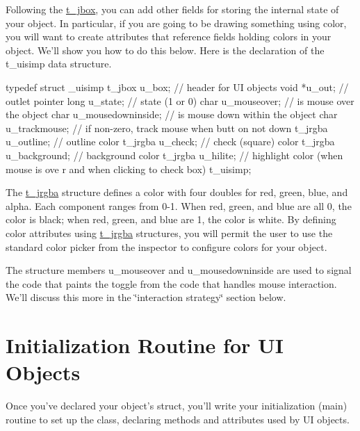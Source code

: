 Following the \hyperlink{structt__jbox}{t\_\-jbox}, you can add other fields for storing the internal state of your object. In particular, if you are going to be drawing something using color, you will want to create attributes that reference fields holding colors in your object. We'll show you how to do this below. Here is the declaration of the t\_\-uisimp data structure.


\begin{DoxyCode}
    typedef struct _uisimp 
    {
        t_jbox u_box;                       // header for UI objects
        void *u_out;                        // outlet pointer
        long u_state;                       // state (1 or 0)
        char u_mouseover;                   // is mouse over the object
        char u_mousedowninside;             // is mouse down within the object
        char u_trackmouse;                  // if non-zero, track mouse when butt
      on not down
        t_jrgba u_outline;                  // outline color
        t_jrgba u_check;                    // check (square) color
        t_jrgba u_background;               // background color
        t_jrgba u_hilite;                   // highlight color (when mouse is ove
      r and when clicking to check box)
    } t_uisimp;
\end{DoxyCode}


The \hyperlink{structt__jrgba}{t\_\-jrgba} structure defines a color with four doubles for red, green, blue, and alpha. Each component ranges from 0-\/1. When red, green, and blue are all 0, the color is black; when red, green, and blue are 1, the color is white. By defining color attributes using \hyperlink{structt__jrgba}{t\_\-jrgba} structures, you will permit the user to use the standard color picker from the inspector to configure colors for your object.

The structure members u\_\-mouseover and u\_\-mousedowninside are used to signal the code that paints the toggle from the code that handles mouse interaction. We'll discuss this more in the \char`\"{}interaction strategy\char`\"{} section below.\hypertarget{chapter_ui_anatomy_chapter_ui_anatomy_init}{}\section{Initialization Routine for UI Objects}\label{chapter_ui_anatomy_chapter_ui_anatomy_init}
Once you've declared your object's struct, you'll write your initialization (main) routine to set up the class, declaring methods and attributes used by UI objects.

